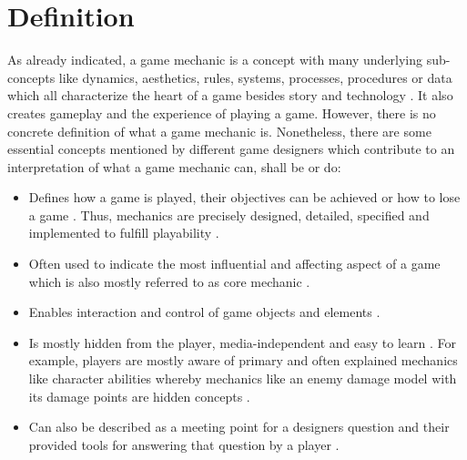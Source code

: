 \documentclass[MGS,Master,english]{twbook}%
\begin{document}
\section{Definition}
As already indicated, a game mechanic is a concept with many underlying sub-concepts like dynamics, aesthetics, rules, systems, processes, procedures or data which all characterize the heart of a game besides story and technology \cite{gameDesign::gameMechanicsAdvancedGameDesign} \cite{gameDesign::bookOfLenses}. It also creates gameplay and the experience of playing a game. However, there is no concrete definition of what a game mechanic is. Nonetheless, there are some essential concepts mentioned by different game designers which contribute to an interpretation of what a game mechanic can, shall be or do:
\begin{itemize}
	\item Defines how a game is played, their objectives can be achieved or how to lose a game \cite{gameDesign::bookOfLenses}. Thus, mechanics are precisely designed, detailed, specified and implemented to fulfill playability \cite{gameDesign::gameMechanicsAdvancedGameDesign} \cite{gameDesign::bookOfLenses}. 
	\item Often used to indicate the most influential and affecting aspect of a game which is also mostly referred to as core mechanic \cite{gameDesign::gameMechanicsAdvancedGameDesign}. 
	\item Enables interaction and control of game objects and elements \cite{gameDesign::gameMechanicsAdvancedGameDesign}.
	\item Is mostly hidden from the player, media-independent and easy to learn \cite{gameDesign::gameMechanicsAdvancedGameDesign}. For example, players are mostly aware of primary and often explained mechanics like character abilities whereby mechanics like an enemy damage model with its damage points are hidden concepts \cite{gameDesign::gameMechanicsAdvancedGameDesign}.
	\item Can also be described as a meeting point for a designers question and their provided tools for answering that question by a player \cite{mechanic::gamasutra::MikeStout}. 
\end{itemize}
\end{document}

